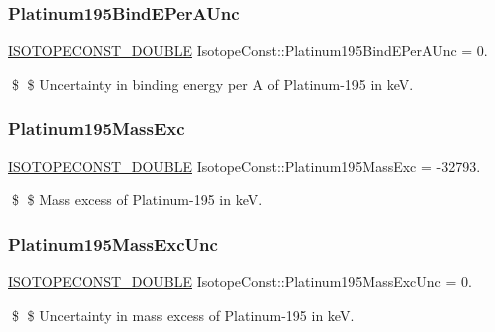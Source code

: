 \subsubsection{\texorpdfstring{Platinum195\+Bind\+E\+Per\+A\+Unc}{Platinum195BindEPerAUnc}}
{\footnotesize\ttfamily \mbox{\hyperlink{group___isotope_const-_macros_ga8f45a7272ce02c0b4c65c44636ed719a}{I\+S\+O\+T\+O\+P\+E\+C\+O\+N\+S\+T\+\_\+\+D\+O\+U\+B\+LE}} Isotope\+Const\+::\+Platinum195\+Bind\+E\+Per\+A\+Unc = 0.}

\$ \$ Uncertainty in binding energy per A of Platinum-\/195 in keV. \mbox{\label{group___isotope_const-_platinum-_pt195_ga99b6e18fa6560364a1eeaa501e49087f}} 
\subsubsection{\texorpdfstring{Platinum195\+Mass\+Exc}{Platinum195MassExc}}
{\footnotesize\ttfamily \mbox{\hyperlink{group___isotope_const-_macros_ga8f45a7272ce02c0b4c65c44636ed719a}{I\+S\+O\+T\+O\+P\+E\+C\+O\+N\+S\+T\+\_\+\+D\+O\+U\+B\+LE}} Isotope\+Const\+::\+Platinum195\+Mass\+Exc = -\/32793.}

\$ \$ Mass excess of Platinum-\/195 in keV. \mbox{\label{group___isotope_const-_platinum-_pt195_gae7dc73722d11a3cd65afb6a30e556853}} 
\subsubsection{\texorpdfstring{Platinum195\+Mass\+Exc\+Unc}{Platinum195MassExcUnc}}
{\footnotesize\ttfamily \mbox{\hyperlink{group___isotope_const-_macros_ga8f45a7272ce02c0b4c65c44636ed719a}{I\+S\+O\+T\+O\+P\+E\+C\+O\+N\+S\+T\+\_\+\+D\+O\+U\+B\+LE}} Isotope\+Const\+::\+Platinum195\+Mass\+Exc\+Unc = 0.}

\$ \$ Uncertainty in mass excess of Platinum-\/195 in keV. \mbox{\label{group___isotope_const-_platinum-_pt195_ga723221e0c45702ca6dc1129e83b83110}} 
